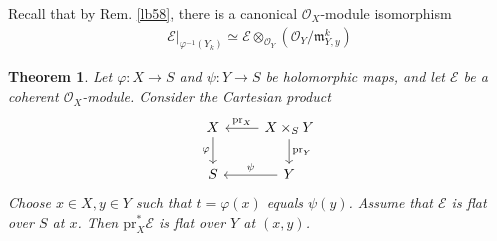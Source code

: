 \documentclass[12pt,b5paper,notitlepage]{report}
\theoremstyle{definition}
\theoremstyle{plain}
\newtheorem{thm}[df]{Theorem}
\newcommand{\fk}{\mathfrak}
\newcommand{\scr}{\mathscr}
\newcommand{\pr}{\mathrm {pr}}
\numberwithin{equation}{section}
\begin{document}
Recall that by Rem. \ref{lb58}, there is a canonical $\scr O_X$-module isomorphism
\begin{subequations}
\begin{gather*}
\scr E|_{\varphi^{-1}(Y_k)}\simeq\scr E\otimes_{\scr O_Y}(\scr O_Y/\fk m_{Y,y}^k)
\end{gather*}
\end{subequations}



\begin{thm}\label{lb271}
Let $\varphi:X\rightarrow S$ and $\psi:Y\rightarrow S$ be holomorphic maps, and let $\scr E$ be a coherent $\scr O_X$-module. Consider the Cartesian product
\begin{equation*}
\begin{tikzcd}
X \arrow[d, "\varphi"'] & X\times_SY \arrow[d, "\pr_Y"] \arrow[l, "\pr_X"'] \\
S                       & Y \arrow[l, "\psi"']                             
\end{tikzcd}
\end{equation*}
Choose $x\in X,y\in Y$ such that $t=\varphi(x)$ equals $\psi(y)$. Assume that $\scr E$ is flat over $S$ at $x$. Then $\pr_X^*\scr E$ is flat over $Y$ at $(x,y)$.
\end{thm}
\end{document}
